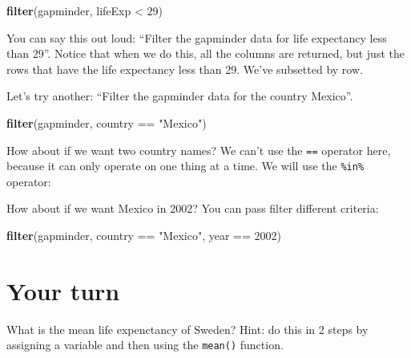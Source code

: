 \documentclass[]{book}
\newenvironment{Shaded}{\begin{snugshade}}{\end{snugshade}}
\newcommand{\KeywordTok}[1]{\textcolor[rgb]{0.13,0.29,0.53}{\textbf{{#1}}}}
\newcommand{\DecValTok}[1]{\textcolor[rgb]{0.00,0.00,0.81}{{#1}}}
\newcommand{\StringTok}[1]{\textcolor[rgb]{0.31,0.60,0.02}{{#1}}}
\newcommand{\NormalTok}[1]{{#1}}
\theoremstyle{definition}
\theoremstyle{definition}
\theoremstyle{definition}
\theoremstyle{remark}
\begin{document}
\begin{Shaded}
\begin{Highlighting}[]
\KeywordTok{filter}\NormalTok{(gapminder, lifeExp <}\StringTok{ }\DecValTok{29}\NormalTok{)}
\end{Highlighting}
\end{Shaded}

You can say this out loud: ``Filter the gapminder data for life
expectancy less than 29''. Notice that when we do this, all the columns
are returned, but just the rows that have the life expectancy less than
29. We've subsetted by row.

Let's try another: ``Filter the gapminder data for the country Mexico''.

\begin{Shaded}
\begin{Highlighting}[]
\KeywordTok{filter}\NormalTok{(gapminder, country ==}\StringTok{ "Mexico"}\NormalTok{)}
\end{Highlighting}
\end{Shaded}

How about if we want two country names? We can't use the \texttt{==}
operator here, because it can only operate on one thing at a time. We
will use the \texttt{\%in\%} operator:

\begin{Shaded}
\end{Shaded}

How about if we want Mexico in 2002? You can pass filter different
criteria:

\begin{Shaded}
\begin{Highlighting}[]
\KeywordTok{filter}\NormalTok{(gapminder, country ==}\StringTok{ "Mexico"}\NormalTok{, year ==}\StringTok{ }\DecValTok{2002}\NormalTok{)}
\end{Highlighting}
\end{Shaded}

\section{Your turn}\label{your-turn-6}

What is the mean life expenctancy of Sweden? Hint: do this in 2 steps by
assigning a variable and then using the \texttt{mean()} function.
\end{document}
